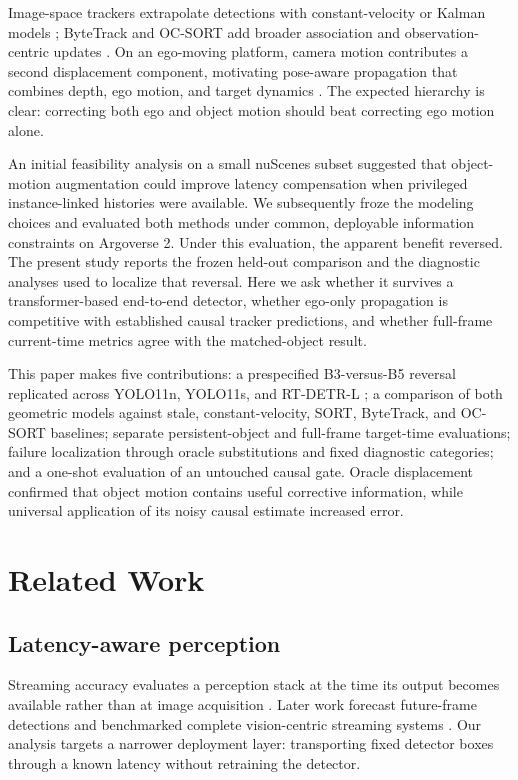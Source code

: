 \documentclass[journal]{IEEEtran}
\begin{document}
Image-space trackers extrapolate detections with constant-velocity or Kalman models \cite{Kalman1960,Bewley2016SORT}; ByteTrack and OC-SORT add broader association and observation-centric updates \cite{Zhang2022ByteTrack,Cao2023OCSORT}. On an ego-moving platform, camera motion contributes a second displacement component, motivating pose-aware propagation that combines depth, ego motion, and target dynamics \cite{Mahdian2024EMAP}. The expected hierarchy is clear: correcting both ego and object motion should beat correcting ego motion alone.

An initial feasibility analysis on a small nuScenes subset suggested that object-motion augmentation could improve latency compensation when privileged instance-linked histories were available. We subsequently froze the modeling choices and evaluated both methods under common, deployable information constraints on Argoverse 2. Under this evaluation, the apparent benefit reversed. The present study reports the frozen held-out comparison and the diagnostic analyses used to localize that reversal. Here we ask whether it survives a transformer-based end-to-end detector, whether ego-only propagation is competitive with established causal tracker predictions, and whether full-frame current-time metrics agree with the matched-object result.

This paper makes five contributions: a prespecified B3-versus-B5 reversal replicated across YOLO11n, YOLO11s, and RT-DETR-L \cite{Zhao2024RTDETR}; a comparison of both geometric models against stale, constant-velocity, SORT, ByteTrack, and OC-SORT baselines; separate persistent-object and full-frame target-time evaluations; failure localization through oracle substitutions and fixed diagnostic categories; and a one-shot evaluation of an untouched causal gate. Oracle displacement confirmed that object motion contains useful corrective information, while universal application of its noisy causal estimate increased error.

\section{Related Work}
\subsection{Latency-aware perception}
Streaming accuracy evaluates a perception stack at the time its output becomes available rather than at image acquisition \cite{Li2020Streaming}. Later work forecast future-frame detections and benchmarked complete vision-centric streaming systems \cite{Yang2022Streaming,Wang2023ASAP}. Our analysis targets a narrower deployment layer: transporting fixed detector boxes through a known latency without retraining the detector.
\end{document}
